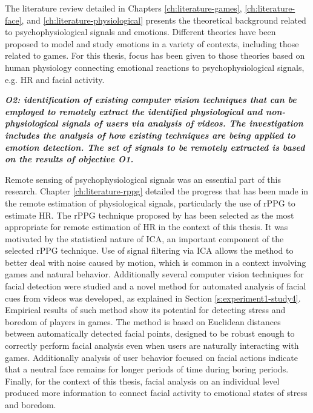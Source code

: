 The literature review detailed in Chapters \ref{ch:literature-games}, \ref{ch:literature-face}, and \ref{ch:literature-physiological} presents the theoretical background related to psychophysiological signals and emotions. Different theories have been proposed to model and study emotions in a variety of contexts, including those related to games. For this thesis, focus has been given to those theories based on human physiology connecting emotional reactions to psychophysiological signals, e.g. HR and facial activity.

\textit{\textbf{O2: identification of existing computer vision techniques that can be employed to remotely extract the identified physiological and non-physiological signals of users via analysis of videos. The investigation includes the analysis of how existing techniques are being applied to emotion detection. The set of signals to be remotely extracted is based on the results of objective \textbf{O1}.}}

Remote sensing of psychophysiological signals was an essential part of this research. Chapter \ref{ch:literature-rppg} detailed the progress that has been made in the remote estimation of physiological signals, particularly the use of rPPG to estimate HR. The rPPG technique proposed by \textcite{poh2011advancements} has been selected as the most appropriate for remote estimation of HR in the context of this thesis. It was motivated by the statistical nature of ICA, an important component of the selected rPPG technique. Use of signal filtering via ICA allows the method to better deal with noise caused by motion, which is common in a context involving games and natural behavior. Additionally several computer vision techniques for facial detection were studied and a novel method for automated analysis of facial cues from videos was developed, as explained in Section \ref{s:experiment1-study4}. Empirical results of such method show its potential for detecting stress and boredom of players in games. The method is based on Euclidean distances between automatically detected facial points, designed to be robust enough to correctly perform facial analysis even when users are naturally interacting with games. Additionally analysis of user behavior focused on facial actions indicate that a neutral face remains for longer periods of time during boring periods. Finally, for the context of this thesis, facial analysis on an individual level produced more information to connect facial activity to emotional states of stress and boredom.

